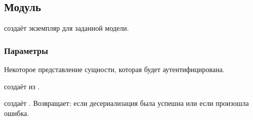 \subsection{Модуль }\label{page-FPauth-core-module-FPauth+u+core-module-Variables-module-Make}%
 создаёт экземпляр \hyperref[page-FPauth-core-module-FPauth+u+core-module-Auth+u+sign-module-type-VARIABLES]{} для заданной модели.

\subsubsection{Параметры\label{parameters}}%
\label{page-FPauth-core-module-FPauth+u+core-module-Variables-module-Make-argument-1-M}\begin{ocamlindent}\label{page-FPauth-core-module-FPauth+u+core-module-Variables-module-Make-argument-1-M-type-t}\begin{ocamlindent}Некоторое представление сущности, которая будет аутентифицирована.\end{ocamlindent}%
\medbreak
\label{page-FPauth-core-module-FPauth+u+core-module-Variables-module-Make-argument-1-M-val-serialize}\begin{ocamlindent} создаёт  из \hyperref[page-FPauth-core-module-FPauth+u+core-module-Variables-module-Make-argument-1-M-type-t]{}.\end{ocamlindent}%
\medbreak
\label{page-FPauth-core-module-FPauth+u+core-module-Variables-module-Make-argument-1-M-val-deserialize}\begin{ocamlindent} создаёт \hyperref[page-FPauth-core-module-FPauth+u+core-module-Variables-module-Make-argument-1-M-type-t]{}. Возвращает:  если десериализация была успешна или  если произошла ошибка.\end{ocamlindent}%

\end{ocamlindent}
